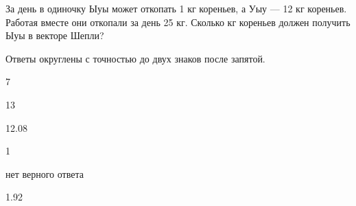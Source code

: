 
\begin{question}
За день в одиночку Ыуы может откопать 1 кг кореньев, а Уыу --- 12 кг кореньев.
Работая вместе они откопали за день 25 кг.
Сколько кг кореньев должен получить Ыуы в векторе Шепли?

Ответы округлены с точностью до двух знаков после запятой.
\begin{answerlist}
  \item 7
  \item 13
  \item 12.08
  \item 1
  \item нет верного ответа
  \item 1.92
\end{answerlist}
\end{question}


